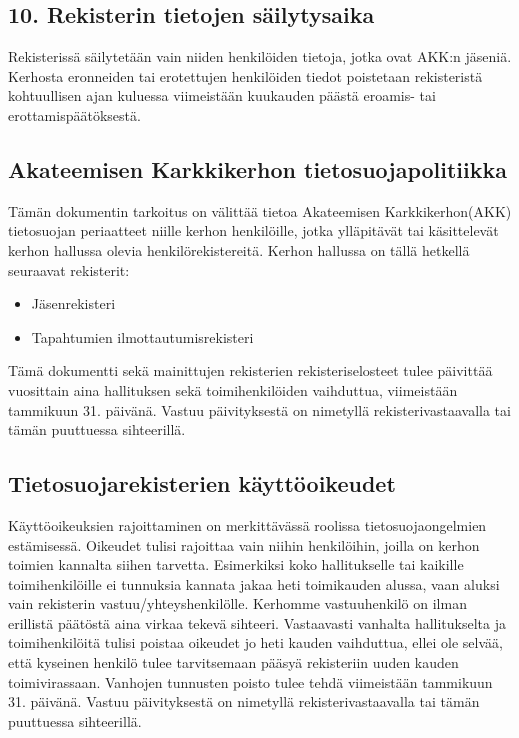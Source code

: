 \documentclass[finnish]{tktltiki}
\begin{document}
\subsection*{10.	Rekisterin tietojen säilytysaika}
Rekisterissä säilytetään vain niiden henkilöiden tietoja, jotka ovat AKK:n jäseniä. Kerhosta eronneiden tai erotettujen henkilöiden tiedot poistetaan rekisteristä kohtuullisen ajan kuluessa viimeistään kuukauden päästä eroamis- tai erottamispäätöksestä.





\subsection*{Akateemisen Karkkikerhon tietosuojapolitiikka}
Tämän dokumentin tarkoitus on välittää tietoa Akateemisen Karkkikerhon(AKK) tietosuojan periaatteet niille kerhon henkilöille, jotka ylläpitävät tai käsittelevät kerhon hallussa olevia henkilörekistereitä. 
Kerhon hallussa on tällä hetkellä seuraavat rekisterit:
\begin{itemize}
    \item Jäsenrekisteri
    \item Tapahtumien ilmottautumisrekisteri
\end{itemize}
Tämä dokumentti sekä mainittujen rekisterien rekisteriselosteet tulee päivittää vuosittain aina hallituksen sekä toimihenkilöiden vaihduttua, viimeistään tammikuun 31. päivänä. Vastuu päivityksestä on nimetyllä rekisterivastaavalla tai tämän puuttuessa sihteerillä.  

\subsection*{Tietosuojarekisterien käyttöoikeudet}
Käyttöoikeuksien rajoittaminen on merkittävässä roolissa tietosuojaongelmien estämisessä. Oikeudet tulisi rajoittaa vain niihin henkilöihin, joilla on kerhon toimien kannalta siihen tarvetta. Esimerkiksi koko hallitukselle tai kaikille toimihenkilöille ei tunnuksia kannata jakaa heti toimikauden alussa, vaan aluksi vain rekisterin vastuu/yhteyshenkilölle. Kerhomme vastuuhenkilö on ilman erillistä päätöstä aina virkaa tekevä sihteeri.
Vastaavasti vanhalta hallitukselta ja toimihenkilöitä tulisi poistaa oikeudet jo heti kauden vaihduttua, ellei ole selvää, että kyseinen henkilö tulee tarvitsemaan pääsyä rekisteriin uuden kauden toimivirassaan. 
Vanhojen tunnusten poisto tulee tehdä viimeistään tammikuun 31. päivänä. Vastuu päivityksestä on nimetyllä rekisterivastaavalla tai tämän puuttuessa sihteerillä.  
\end{document}
